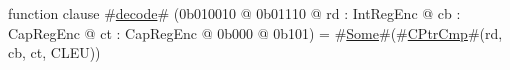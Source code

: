 function clause #\hyperref[zdecode]{decode}# (0b010010 @ 0b01110 @ rd : IntRegEnc @ cb : CapRegEnc @ ct : CapRegEnc @ 0b000 @ 0b101) = #\hyperref[zSome]{Some}#(#\hyperref[zCPtrCmp]{CPtrCmp}#(rd, cb, ct, CLEU))
